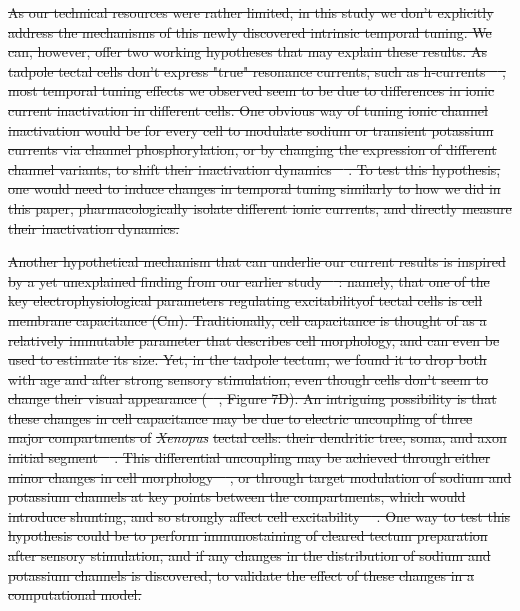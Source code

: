 \documentclass{article}
\providecommand{\DIFdeltex}[1]{{\protect\color{red}\sout{#1}}}                      %
\providecommand{\DIFdelbegin}{} %
\providecommand{\DIFdel}[1]{\texorpdfstring{\DIFdeltex{#1}}{}} %
\newcommand{\DIFscaledelfig}{0.5}
\newlength{\DIFdelgraphicswidth} %
\newlength{\DIFdelgraphicsheight} %
\newcommand{\DIFdelincludegraphics}[2][]{%
\sbox{\DIFdelgraphicsbox}{\DIFOincludegraphics[#1]{#2}}%
\settoboxwidth{\DIFdelgraphicswidth}{\DIFdelgraphicsbox} %
\settoboxtotalheight{\DIFdelgraphicsheight}{\DIFdelgraphicsbox} %
\scalebox{\DIFscaledelfig}{%
\parbox[b]{\DIFdelgraphicswidth}{\usebox{\DIFdelgraphicsbox}\\[-\baselineskip] \rule{\DIFdelgraphicswidth}{0em}}\llap{\resizebox{\DIFdelgraphicswidth}{\DIFdelgraphicsheight}{%
\setlength{\unitlength}{\DIFdelgraphicswidth}%
\begin{picture}(1,1)%
\thicklines\linethickness{2pt} %
{\color[rgb]{1,0,0}\put(0,0){\framebox(1,1){}}}%
{\color[rgb]{1,0,0}\put(0,0){\line( 1,1){1}}}%
{\color[rgb]{1,0,0}\put(0,1){\line(1,-1){1}}}%
\end{picture}%
}\hspace*{3pt}}} %
} %
\DeclareRobustCommand{\DIFdelbegin}{\DIFOdelbegin \let\includegraphics\DIFdelincludegraphics} %
\begin{document}
\DIFdelbegin \DIFdel{As our technical resources were rather limited, in this study we don't explicitly address the mechanisms of this newly discovered intrinsic temporal tuning. We can, however, offer two working hypotheses that may explain these results. As tadpole tectal cells don't express "true" resonance currents, such as h-currents \mbox{%
\citep{ciarleglio2015}}\hspace{0pt}%
, most temporal tuning effects we observed seem to be due to differences in ionic current inactivation in different cells. One obvious way of tuning ionic channel inactivation would be for every cell to modulate sodium or transient potassium currents via channel phosphorylation, or by changing the expression of different channel variants, to shift their inactivation dynamics \mbox{%
\citep{frank2003nachannels,goldwyn2018a_current}}\hspace{0pt}%
. To test this hypothesis, one would need to induce changes in temporal tuning similarly to how we did in this paper, pharmacologically isolate different ionic currents, and directly measure their inactivation dynamics.
}%

\DIFdel{Another hypothetical mechanism that can underlie our current results is inspired by a yet unexplained finding from our earlier study \mbox{%
\citep{ciarleglio2015}}\hspace{0pt}%
: namely, that one of the key electrophysiological parameters regulating excitabilityof tectal cells is cell membrane capacitance (Cm).
Traditionally, cell capacitance is thought of as a relatively immutable parameter that describes cell morphology, and can even be used to estimate its size. Yet, in the tadpole tectum, we found it to drop both with age and after strong sensory stimulation, even though cells don't seem to change their visual appearance (\mbox{%
\citealt{ciarleglio2015}}\hspace{0pt}%
, Figure 7D). An intriguing possibility is that these changes in cell capacitance may be due to electric uncoupling of three major compartments of }\textit{\DIFdel{Xenopus}} %
\DIFdel{tectal cells: their dendritic tree, soma, and axon initial segment \mbox{%
\citep{bollmann2009,jarvis2018morphology}}\hspace{0pt}%
. This differential uncoupling may be achieved through either minor changes in cell morphology \mbox{%
\citep{leterrier2018axon}}\hspace{0pt}%
, or through target modulation of sodium and potassium channels at key points between the compartments, which would introduce shunting, and so strongly affect cell excitability \mbox{%
\citep{grubb2010activity,kuba2010initial}}\hspace{0pt}%
. One way to test this hypothesis could be to perform immunostaining of cleared tectum preparation after sensory stimulation, and if any changes in the distribution of sodium and potassium channels is discovered, to validate the effect of these changes in a computational model.
}%
\end{document}
